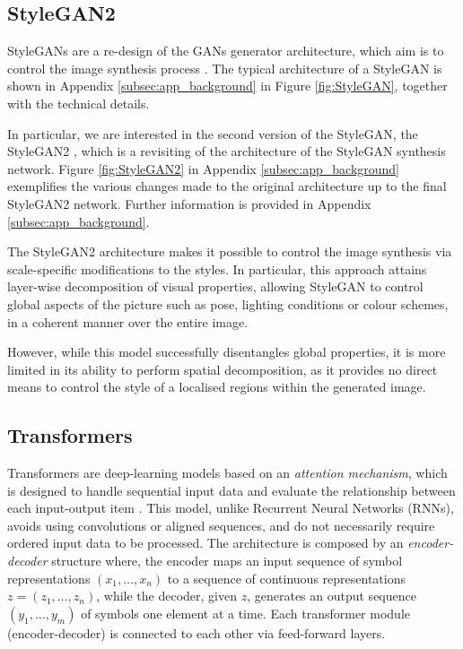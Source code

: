 \documentclass{article}
\begin{document}
	\subsection{StyleGAN2}\label{sec:StyleGAN}
	StyleGANs are a re-design of the GANs generator architecture, which aim is to control the image 
	synthesis process \cite{karras2019style}. The typical architecture of a StyleGAN is shown in 
	Appendix \ref{subsec:app_background} in Figure \ref{fig:StyleGAN}, together with the technical 
	details. 
	
	In particular, we are interested in the second version of the StyleGAN, the StyleGAN2 
	\cite{karras2020analyzing}, which is a revisiting of the architecture of the StyleGAN synthesis 
	network. Figure \ref{fig:StyleGAN2} in Appendix \ref{subsec:app_background} exemplifies the 
	various changes made to the original architecture up to the final StyleGAN2 network. Further 
	information is provided in Appendix \ref{subsec:app_background}.
	
	The StyleGAN2 architecture makes it possible to control the image synthesis via scale-specific 
	modifications to the styles. In particular, this approach attains layer-wise decomposition of visual 
	properties, allowing StyleGAN to control global aspects of the picture such as pose, lighting 
	conditions or colour schemes, in a coherent manner over the entire image.
	
	However, while this model successfully disentangles global properties, it is more limited in its ability 
	to perform spatial decomposition, as it provides no direct means to control the style of a localised 
	regions within the generated image.
	
	\subsection{Transformers}\label{sec:transformer}
	Transformers are deep-learning models based on an \textit{attention mechanism}, which is 
	designed 
	to handle sequential input data and evaluate the relationship between each input-output item 
	\cite{vaswani2017attention}.
	This model, unlike Recurrent Neural Networks (RNNs), avoids using convolutions or aligned 
	sequences, and do not necessarily require ordered input data to be processed. 
	The architecture is composed by an \textit{encoder-decoder} structure where, the {encoder} maps 
	an input sequence of symbol representations $(x_1,\dots, x_n)$ to a sequence of continuous 
	representations $z = (z_1, \dots, z_n)$, while the  {decoder}, given $z$, generates an output 
	sequence $(y_1, \dots, y_m)$ of symbols one element at a time. 
	Each transformer module (encoder-decoder) is connected to each other via feed-forward
	layers.
	
\end{document}
